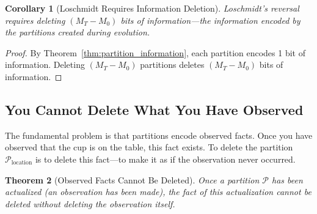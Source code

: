 \documentclass[twocolumn,10pt]{article}
\newtheorem{theorem}{Theorem}[section]
\newtheorem{corollary}[theorem]{Corollary}
\theoremstyle{definition}
\theoremstyle{remark}
\begin{document}
\begin{corollary}[Loschmidt Requires Information Deletion]
\label{cor:loschmidt_information_deletion}
Loschmidt's reversal requires deleting $(M_T - M_0)$ bits of information—the information encoded by the partitions created during evolution.
\end{corollary}

\begin{proof}
By Theorem~\ref{thm:partition_information}, each partition encodes 1 bit of information. Deleting $(M_T - M_0)$ partitions deletes $(M_T - M_0)$ bits of information.
\end{proof}

\subsection{You Cannot Delete What You Have Observed}

The fundamental problem is that partitions encode observed facts. Once you have observed that the cup is on the table, this fact exists. To delete the partition $\mathcal{P}_{\text{location}}$ is to delete this fact—to make it as if the observation never occurred.

\begin{theorem}[Observed Facts Cannot Be Deleted]
\label{thm:observed_facts}
Once a partition $\mathcal{P}$ has been actualized (an observation has been made), the fact of this actualization cannot be deleted without deleting the observation itself.
\end{theorem}
\end{document}
